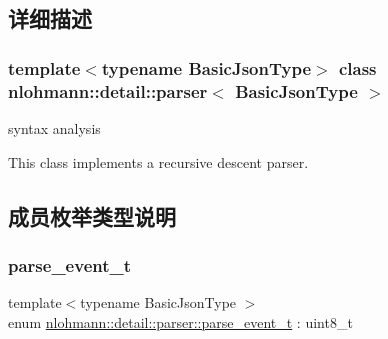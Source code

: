 \subsection{详细描述}
\subsubsection*{template$<$typename Basic\+Json\+Type$>$\newline
class nlohmann\+::detail\+::parser$<$ Basic\+Json\+Type $>$}

syntax analysis 

This class implements a recursive descent parser. 

\subsection{成员枚举类型说明}
\mbox{\label{classnlohmann_1_1detail_1_1parser_a37ac88c864dda495f72cb62776b0bebe}} 
\subsubsection{\texorpdfstring{parse\_event\_t}{parse\_event\_t}}
{\footnotesize\ttfamily template$<$typename Basic\+Json\+Type $>$ \\
enum \mbox{\hyperlink{classnlohmann_1_1detail_1_1parser_a37ac88c864dda495f72cb62776b0bebe}{nlohmann\+::detail\+::parser\+::parse\+\_\+event\+\_\+t}} \+: uint8\+\_\+t\hspace{0.3cm}{\ttfamily [strong]}}

